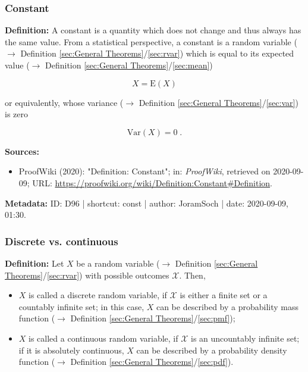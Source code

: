 \documentclass[a4paper,12pt,twoside]{book}
\begin{document}
\subsubsection[\textit{Constant}]{Constant} \label{sec:const}
\setcounter{equation}{0}

\textbf{Definition:} A constant is a quantity which does not change and thus always has the same value. From a statistical perspective, a constant is a random variable ($\rightarrow$ Definition \ref{sec:General Theorems}/\ref{sec:rvar}) which is equal to its expected value ($\rightarrow$ Definition \ref{sec:General Theorems}/\ref{sec:mean})

\begin{equation} \label{eq:const-EX}
X = \mathrm{E}(X)
\end{equation}

or equivalently, whose variance ($\rightarrow$ Definition \ref{sec:General Theorems}/\ref{sec:var}) is zero

\begin{equation} \label{eq:const-VarX}
\mathrm{Var}(X) = 0 \; .
\end{equation}


\vspace{1em}
\textbf{Sources:}
\begin{itemize}
\item ProofWiki (2020): "Definition: Constant"; in: \textit{ProofWiki}, retrieved on 2020-09-09; URL: \url{https://proofwiki.org/wiki/Definition:Constant#Definition}.
\end{itemize}


\vspace{1em}
\textbf{Metadata:} ID: D96 | shortcut: const | author: JoramSoch | date: 2020-09-09, 01:30.
\vspace{1em}



\subsubsection[\textit{Discrete vs. continuous}]{Discrete vs. continuous} \label{sec:rvar-disc}
\setcounter{equation}{0}

\textbf{Definition:} Let $X$ be a random variable ($\rightarrow$ Definition \ref{sec:General Theorems}/\ref{sec:rvar}) with possible outcomes $\mathcal{X}$. Then,

\begin{itemize}

\item $X$ is called a discrete random variable, if $\mathcal{X}$ is either a finite set or a countably infinite set; in this case, $X$ can be described by a probability mass function ($\rightarrow$ Definition \ref{sec:General Theorems}/\ref{sec:pmf});

\item $X$ is called a continuous random variable, if $\mathcal{X}$ is an uncountably infinite set; if it is absolutely continuous, $X$ can be described by a probability density function ($\rightarrow$ Definition \ref{sec:General Theorems}/\ref{sec:pdf}).

\end{itemize}
\end{document}

